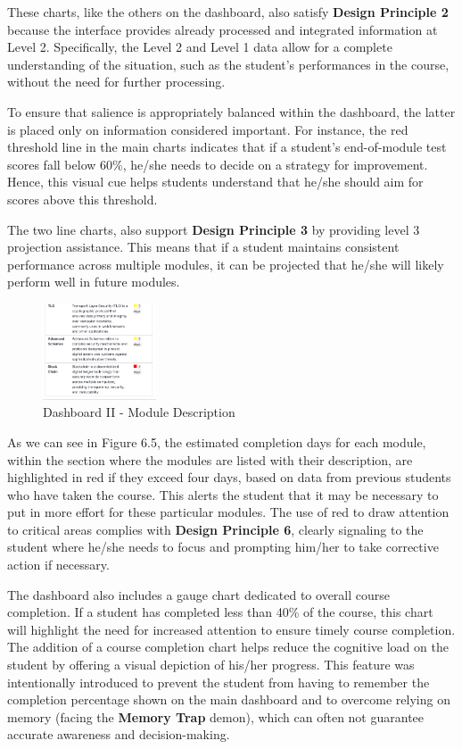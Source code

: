These charts, like the others on the dashboard, also satisfy \textbf{Design Principle 2} because the interface provides already processed and integrated information at Level 2. Specifically, the Level 2 and Level 1 data allow for a complete understanding of the situation, such as the student's performances in the course, without the need for further processing.

To ensure that salience is appropriately balanced within the dashboard, the latter is placed only on information considered important. For instance, the red threshold line in the main charts indicates that if a student's end-of-module test scores fall below 60\%, he/she needs to decide on a strategy for improvement. Hence, this visual cue helps students understand that he/she should aim for scores above this threshold.

The two line charts, also support \textbf{Design Principle 3} by providing level 3 projection assistance. This means that if a student maintains consistent performance across multiple modules, it can be projected that he/she will likely perform well in future modules. 

\begin{figure}[H]
    \centering
    \includegraphics[width=0.3\textwidth]{assets/descriptionmodule.png}
    \caption{Dashboard II - Module Description}
    \label{fig:dashboard_2} 
\end{figure}

As we can see in Figure 6.5, the estimated completion days for each module, within the section where the modules are listed with their description, are highlighted in red if they exceed four days, based on data from previous students who have taken the course. This alerts the student that it may be necessary to put in more effort for these particular modules.
The use of red to draw attention to critical areas complies with \textbf{Design Principle 6}, clearly signaling to the student where he/she needs to focus and prompting him/her to take corrective action if necessary.

The dashboard also includes a gauge chart dedicated to overall course completion. If a student has completed less than 40\% of the course, this chart will highlight the need for increased attention to ensure timely course completion.
The addition of a course completion chart helps reduce the cognitive load on the student by offering a visual depiction of his/her progress. This feature was intentionally introduced to prevent the student from having to remember the completion percentage shown on the main dashboard and to overcome relying on memory (facing the \textbf{Memory Trap} demon), which can often not guarantee accurate awareness and decision-making.

